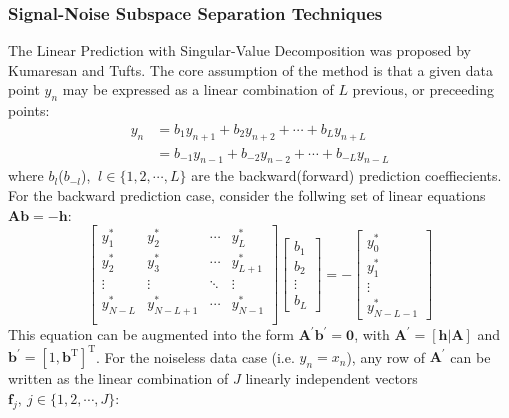\subsubsection{Signal-Noise Subspace Separation Techniques}

The Linear Prediction with Singular-Value Decomposition was proposed by Kumaresan and Tufts\cite{Kumaresan1982}. The core assumption of the method is that a given data point $y_n$ may be expressed as a linear combination of $L$ previous, or preceeding points:
\begin{equation}
  \begin{split}
    y_n &= b_1 y_{n+1} + b_2 y_{n+2} + \cdots + b_L y_{n+L}\\
    &= b_{-1} y_{n-1} + b_{-2} y_{n-2} + \cdots + b_{-L} y_{n-L}
  \end{split}
\end{equation}
where $b_l$($b_{-l}$), $\ l \in \{ 1, 2, \cdots, L \}$ are the backward(forward) prediction coeffiecients. For the backward prediction case, consider the follwing set of linear equations $\symbf{A} \symbf{b} = - \symbf{h}$:
\begin{equation}
  \label{lineqs}
  \begin{bmatrix}
    y_1^* & y_2^* & \cdots & y_L^*\\
    y_2^* & y_3^* & \cdots & y_{L+1}^*\\
    \vdots & \vdots & \ddots & \vdots\\
    y_{N-L}^* & y_{N-L+1}^* & \cdots & y_{N-1}^*\\
  \end{bmatrix}
  \begin{bmatrix}
    b_1\\
    b_2\\
    \vdots\\
    b_L
  \end{bmatrix}
  = -
  \begin{bmatrix}
    y_0^*\\
    y_1^*\\
    \vdots\\
    y_{N-L-1}^*
  \end{bmatrix}
\end{equation}
This equation can be augmented into the form $\symbf{A}^{\prime} \symbf{b}^{\prime} = \symbf{0}$, with $\symbf{A}^{\prime} = \left[ \symbf{h} \vert \symbf{A} \right]$ and $\symbf{b}^{\prime} = \left[1, \symbf{b}^{\mathrm{T}} \right]^{\mathrm{T}}$. For the noiseless data case (i.e. $y_n = x_n$), any row of $\symbf{A}^{\prime}$ can be written as the linear combination of $J$ linearly independent vectors $\symbf{f}_j,\ j \in \{1, 2, \cdots, J\}$\cite{Kumaresan1983}:
